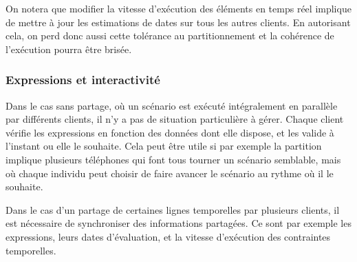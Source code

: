 \documentclass[10pt]{article}
\begin{document}
On notera que modifier la vitesse d'exécution des éléments en temps réel implique de mettre à jour les estimations de dates sur tous les autres clients. 
En autorisant cela, on perd donc aussi cette tolérance au partitionnement et la cohérence de l'exécution pourra être brisée.

\begin{figure}[h]
	\centering
	\begin{tikzpicture}
	
	\end{tikzpicture}
	\label{scenar.non-interactif}
\end{figure}


\subsubsection{Expressions et interactivité}
\label{section.expr-interact}
Dans le cas sans partage, où un scénario est exécuté intégralement en parallèle par différents clients, il n'y a pas de situation particulière à gérer.
Chaque client vérifie les expressions en fonction des données dont elle dispose, et les valide à l'instant ou elle le souhaite. 
Cela peut être utile si par exemple la partition implique plusieurs téléphones qui font tous tourner un scénario semblable, mais où chaque individu peut choisir de faire avancer le scénario au rythme où il le souhaite.

Dans le cas d'un partage de certaines lignes temporelles par plusieurs clients, il est nécessaire de synchroniser des informations partagées.
Ce sont par exemple les expressions, leurs dates d'évaluation, et la vitesse d'exécution des contraintes temporelles.
\end{document}
